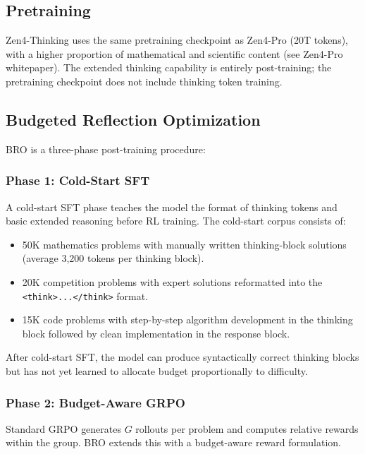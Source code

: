 \documentclass[11pt,a4paper]{article}
\begin{document}
\subsection{Pretraining}

Zen4-Thinking uses the same pretraining checkpoint as Zen4-Pro (20T tokens), with a
higher proportion of mathematical and scientific content (see Zen4-Pro whitepaper).
The extended thinking capability is entirely post-training; the pretraining checkpoint
does not include thinking token training.

\subsection{Budgeted Reflection Optimization}

BRO is a three-phase post-training procedure:

\subsubsection{Phase 1: Cold-Start SFT}

A cold-start SFT phase teaches the model the format of thinking tokens and basic
extended reasoning before RL training. The cold-start corpus consists of:

\begin{itemize}
    \item 50K mathematics problems with manually written thinking-block solutions
    (average 3,200 tokens per thinking block).
    \item 20K competition problems with expert solutions reformatted into the
    \texttt{<think>...</think>} format.
    \item 15K code problems with step-by-step algorithm development in the thinking block
    followed by clean implementation in the response block.
\end{itemize}

After cold-start SFT, the model can produce syntactically correct thinking blocks
but has not yet learned to allocate budget proportionally to difficulty.

\subsubsection{Phase 2: Budget-Aware GRPO}

Standard GRPO \cite{shao2024grpo} generates $G$ rollouts per problem and
computes relative rewards within the group. BRO extends this with a budget-aware
reward formulation.
\end{document}
